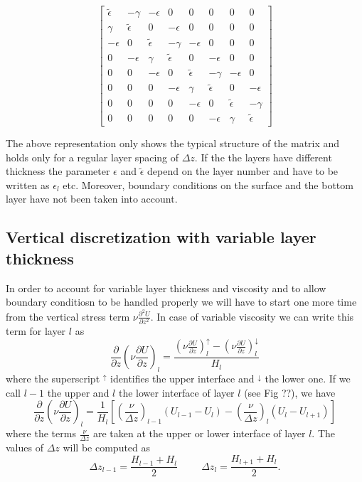 \documentclass[12pt,draft]{article}
\newcommand{\Unod}{U}
\newcommand{\dz}{\Delta z}
\newcommand{\dpartz}[1]{\frac{\partial #1}{\partial z}}
\newcommand{\dpartzz}[1]{\frac{\partial^2 #1}{\partial z^2}}
\begin{document}
{
\newcommand{\EE}{-\epsilon}
\newcommand{\ET}{\tilde{\epsilon}}
\newcommand{\GG}{\gamma}
\begin{equation}
\begin{bmatrix}
\ET  & -\GG & \EE & 0      & 0    & 0 & 0 & 0 \\
\GG & \ET   & 0    & \EE   & 0    & 0 & 0 & 0 \\
\EE  & 0      & \ET & -\GG & \EE & 0 & 0 & 0\\
0     & \EE   & \GG & \ET  & 0    & \EE   & 0 & 0 \\
0 & 0 & \EE  & 0      & \ET & -\GG & \EE & 0 \\
0 & 0 & 0     & \EE   & \GG & \ET  & 0    & \EE \\
0 & 0 & 0 & 0 & \EE  & 0      & \ET & -\GG \\
0 & 0 & 0 & 0 & 0     & \EE   & \GG & \ET      
\end{bmatrix}
\end{equation}
}

The above representation only shows the typical structure
of the matrix and holds only for a regular layer spacing
of $\dz$. If the the layers have different thickness the parameter
$\epsilon$ and $\tilde{\epsilon}$ depend on the layer number
and have to be written as $\epsilon_l$ etc. Moreover, boundary conditions on the surface and the bottom layer have not been 
taken into account.

\subsection{Vertical discretization with variable layer thickness}

In order to account for variable layer thickness and viscosity
and to allow boundary conditiosn to be handled properly we will have to start one more time from the vertical stress term
$\nu\dpartzz{\Unod}$. In case of variable viscosity we can write
this term for layer $l$ as
\begin{equation}
\dpartz{} \left( \nu\dpartz{U} \right)_l =
\frac{ \left( \nu\dpartz{U} \right)^\uparrow_l 
 - \left( \nu\dpartz{U} \right)^\downarrow_l
}{H_l}
\end{equation}
where the superscript ${}^\uparrow$ identifies the upper
interface and ${}^\downarrow$ the lower one. If we call $l-1$
the upper and $l$ the lower interface of layer $l$ (see Fig ??), we have
\begin{equation}
\dpartz{} \left( \nu\dpartz{U} \right)_l =
\frac{1}{H_l} \left[
	\left( \frac{\nu}{\dz} \right)_{l-1} (U_{l-1}-U_l)
 	- \left( \frac{\nu}{\dz} \right)_{l} (U_l-U_{l+1})
\right]
\end{equation}
where the terms $\frac{\nu}{\dz}$ are taken at the upper or
lower interface of layer $l$. The values of $\dz$ will be
computed as
\begin{equation}
\dz_{l-1} = \frac{H_{l-1}+H_l}{2}
	\hspace{1cm}
\dz_{l} = \frac{H_{l+1}+H_l}{2}.
\end{equation}
\end{document}
